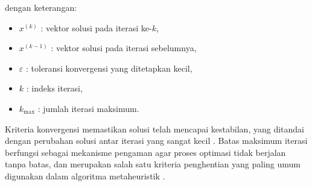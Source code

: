 dengan keterangan:
\begin{itemize}
    \item $x^{(k)}$ : vektor solusi pada iterasi ke-$k$,
    \item $x^{(k-1)}$ : vektor solusi pada iterasi sebelumnya,
    \item $\varepsilon$ : toleransi konvergensi yang ditetapkan kecil,
    \item $k$ : indeks iterasi,
    \item $k_{\max}$ : jumlah iterasi maksimum.
\end{itemize}

Kriteria konvergensi memastikan solusi telah mencapai kestabilan, yang ditandai dengan perubahan solusi antar iterasi yang sangat kecil . Batas maksimum iterasi berfungsi sebagai mekanisme pengaman agar proses optimasi tidak berjalan tanpa batas, dan merupakan salah satu kriteria penghentian yang paling umum digunakan dalam algoritma metaheuristik .
